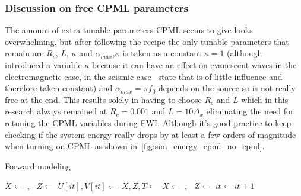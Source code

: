 \documentclass[10pt]{SelfArx} %
\theoremstyle{definition}
\begin{document}
\subsubsection{Discussion on free CPML parameters}
The amount of extra tunable parameters CPML seems to give looks overwhelming, but after following the recipe the only tunable parameters that remain are $R_c$, $L$, $\kappa$ and $\alpha_{max}$,$\kappa$ is taken as a constant $\kappa=1$ (although~\cite{Roden2000} introduced a variable $\kappa$ because it can have an effect on evanescent waves in the electromagnetic case, in the seismic case~\cite{Komatitsch2007} state that is of little influence and therefore taken constant) and $\alpha_{max}=\pi f_0$ depends on the source so is not really free at the end. This results solely in having to choose $R_c$ and $L$ which in this research always remained at $R_c=0.001$ and $L=10\Delta_x$ eliminating the need for retuning the CPML variables during FWI. Although it's good practice to keep checking if the system energy really drops by at least a few orders of magnitude when turning on CPML as shown in~\cref{fig:sim_energy_cpml_no_cpml}.

\begin{algorithm}
\caption{Forward modeling}\label{alg:forward_prop}
\begin{algorithmic}[1]
\State $X \gets$ , \ $Z \gets$  
\State $U[it], V[it] \gets $  
\State $X, Z, T \gets $  
\State $X \gets$ , \ $Z \gets$  
\State $it \gets it + 1$
\EndFor
\EndFunction
\end{algorithmic}
\end{algorithm} 


\end{document}
